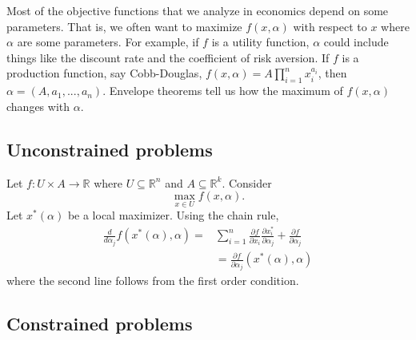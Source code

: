 \documentclass[12pt,reqno]{amsart}
\theoremstyle{definition}
\def\R{\mathbb{R}}
\renewcommand{\to}{{\rightarrow}}
\begin{document}
Most of the objective functions that we analyze in economics depend on
some parameters. That is, we often want to maximize $f(x,\alpha)$ with
respect to $x$ where $\alpha$ are some parameters. For example, if $f$ is a
utility function, $\alpha$ could include things like the discount rate and
the coefficient of risk aversion. If $f$ is a production function, say
Cobb-Douglas, $f(x,\alpha) = A \prod_{i=1}^n x_i^{a_i}$, then $\alpha
= (A,a_1,...,a_n)$. Envelope theorems tell us how the maximum of
$f(x,\alpha)$ changes with $\alpha$. 

\subsection{Unconstrained problems}

Let $f:U \times A \to \R$ where $U \subseteq \R^n$ and $A
\subseteq \R^k$. Consider
\[ \max_{x \in U} f(x,\alpha). \]
Let $x^*(\alpha)$ be a local maximizer. Using the chain rule,
\begin{align*}
  \frac{d }{d \alpha_j} f(x^*(\alpha),\alpha) = & \sum_{i=1}^n
  \frac{\partial f}{\partial x_i} \frac{\partial x_i^*}{\partial \alpha_j}
  + \frac{\partial f}{\partial \alpha_j } \\
  & = \frac{\partial f}{\partial \alpha_j }(x^*(\alpha),\alpha)
\end{align*}
where the second line follows from the first order condition.


\subsection{Constrained problems}
\end{document}
